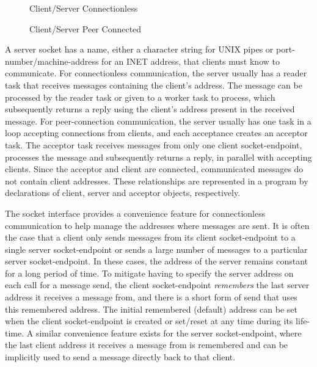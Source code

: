 \documentclass[openright,twoside]{report}
\begin{document}
\begin{figure}
\centering

\caption{Client/Server Connectionless}
\label{f:ClientServerUnconnected}

\qquad


\caption{Client/Server Peer Connected}
\label{f:ClientServerConnected}
\end{figure}

A server socket has a name, either a character string for UNIX pipes or port-number/machine-address for an INET address, that clients must know to communicate.
For connectionless communication, the server usually has a reader task that receives messages containing the client's address.
The message can be processed by the reader task or given to a worker task to process, which subsequently returns a reply using the client's address present in the received message.
For peer-connection communication, the server usually has one task in a loop accepting connections from clients, and each acceptance creates an acceptor task.
The acceptor task receives messages from only one client socket-endpoint, processes the message and subsequently returns a reply, in parallel with accepting clients.
Since the acceptor and client are connected, communicated messages do not contain client addresses.
These relationships are represented in a \uC program by declarations of client, server and acceptor objects, respectively.

The \uC socket interface provides a convenience feature for connectionless communication to help manage the addresses where messages are sent.
It is often the case that a client only sends messages from its client socket-endpoint to a single server socket-endpoint or sends a large number of messages to a particular server socket-endpoint.
In these cases, the address of the server remains constant for a long period of time.
To mitigate having to specify the server address on each call for a message send, the client socket-endpoint \emph{remembers} the last server address it receives a message from, and there is a short form of send that uses this remembered address.
The initial remembered (default) address can be set when the client socket-endpoint is created or set/reset at any time during its life-time.
A similar convenience feature exists for the server socket-endpoint, where the last client address it receives a message from is remembered and can be implicitly used to send a message directly back to that client.
\end{document}
